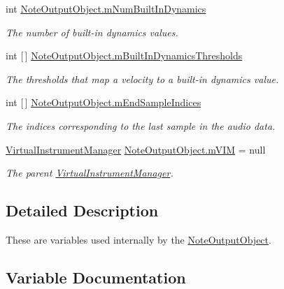 \begin{DoxyCompactItemize}
int \hyperlink{group___n_o_o_priv_var_ga3cc04564fcc1b1c4597af18e7e4fbc47}{Note\+Output\+Object.\+m\+Num\+Built\+In\+Dynamics}
\begin{DoxyCompactList}\small\item\em The number of built-\/in dynamics values. \end{DoxyCompactList}\item 
int \mbox{[}$\,$\mbox{]} \hyperlink{group___n_o_o_priv_var_ga6a530f5e624caf8087c636df98d7f0b0}{Note\+Output\+Object.\+m\+Built\+In\+Dynamics\+Thresholds}
\begin{DoxyCompactList}\small\item\em The thresholds that map a velocity to a built-\/in dynamics value. \end{DoxyCompactList}\item 
int \mbox{[}$\,$\mbox{]} \hyperlink{group___n_o_o_priv_var_ga48c676306790f40714072cd6a81a0128}{Note\+Output\+Object.\+m\+End\+Sample\+Indices}
\begin{DoxyCompactList}\small\item\em The indices corresponding to the last sample in the audio data. \end{DoxyCompactList}\item 
\hyperlink{class_virtual_instrument_manager}{Virtual\+Instrument\+Manager} \hyperlink{group___n_o_o_priv_var_ga61394090fddcb90c67bf68f19a5bfb6e}{Note\+Output\+Object.\+m\+V\+IM} = null
\begin{DoxyCompactList}\small\item\em The parent \hyperlink{class_virtual_instrument_manager}{Virtual\+Instrument\+Manager}. \end{DoxyCompactList}\end{DoxyCompactItemize}


\subsection{Detailed Description}
These are variables used internally by the \hyperlink{class_note_output_object}{Note\+Output\+Object}. 

\subsection{Variable Documentation}
\mbox{\label{group___n_o_o_priv_var_ga842eef5bfade070f914b8a551b3bcf43}} 
